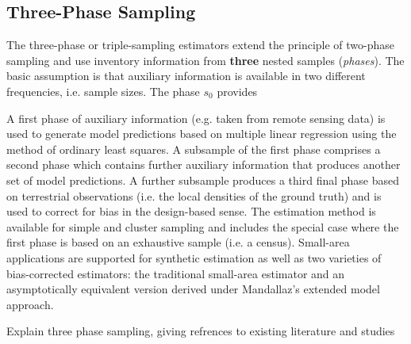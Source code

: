 \documentclass[article]{jss}
\begin{document}
\subsection{Three-Phase Sampling}

The three-phase or triple-sampling estimators extend the principle of two-phase sampling and use inventory information from \textbf{three} nested samples (\textit{phases}). The basic assumption is that auxiliary information is available in two different frequencies, i.e. sample sizes. The phase $s_0$ provides




A first phase of auxiliary information (e.g. taken from remote sensing data) is used to generate model predictions based on multiple linear regression using the method of ordinary least squares. A subsample of the first phase comprises a second phase which contains further auxiliary information that produces another set of model predictions. A further subsample produces a third final phase based on terrestrial observations (i.e. the local densities of the ground truth) and is used to correct for bias in the design-based sense. The estimation method is available for simple and cluster sampling and includes the special case where the first phase is based on an exhaustive sample (i.e. a census). Small-area applications are supported for synthetic estimation as well as two varieties of bias-corrected estimators: the traditional small-area estimator and an asymptotically equivalent version derived under Mandallaz's extended model approach.


Explain three phase sampling, giving refrences to existing literature and studies
\end{document}
